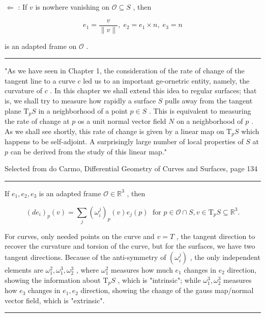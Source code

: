 \documentclass[lang=cn,a4paper,11pt,openany,twoside]{elegantbook}
\newcommand{\HRule}{\begin{center}\rule{0.9\linewidth}{0.2mm}\end{center}}
\begin{document}
\(\Leftarrow\) : If \(v\) is nowhere vanishing on \(\mathcal{O} \subseteq  S\) , then

\[
{e}_{1} = \frac{v}{\parallel v\parallel },\;{e}_{2} = {e}_{1} \times  n,\;{e}_{3} = n
\]

is an adapted frame on \(\mathcal{O}\) .

\HRule

"As we have seen in Chapter 1, the consideration of the rate of change of the tangent line to a curve \(c\) led us to an important ge-ornetric entity, namely, the curvature of \(c\) . In this chapter we shall extend this idea to regular surfaces; that is, we shall try to measure how rapidly a surface \(S\) pulls away from the tangent plane \({\mathrm{T}}_{p}S\) in a neighborhood of a point \(p \in  S\) . This is equivalent to measuring the rate of change at \(p\) os a unit normal vector field \(N\) on a neighborhood of \(p\) . As we shall see shortly, this rate of change is given by a linear map on \({\mathrm{T}}_{p}S\) which happens to be self-adjoint. A surprisingly large number of local properties of \(S\) at \(p\) can be derived from the study of this linear map."

Selected from do Carmo, Differential Geometry of Curves and Surfaces, page 134

\HRule

If \({e}_{1},{e}_{2},{e}_{3}\) is an adapted frame \(\mathcal{O} \in  {\mathbb{R}}^{3}\) , then

\[
{\left( d{e}_{i}\right) }_{p}\left( v\right)  = \mathop{\sum }\limits_{j}{\left( {\omega }_{i}^{j}\right) }_{p}\left( v\right) {e}_{j}\left( p\right) \;\text{ for }p \in  \mathcal{O} \cap  S,v \in  {\mathrm{T}}_{p}S \subseteq  {\mathbb{R}}^{3}.
\]

For curves, only needed points on the curve and \(v = T\) , the tangent direction to recover the curvature and torsion of the curve, but for the surfaces, we have two tangent directions. Because of the anti-symmetry of \(\left( {\omega }_{i}^{j}\right)\) , the only independent elements are \({\omega }_{1}^{2},{\omega }_{1}^{3},{\omega }_{2}^{3}\) , where \({\omega }_{1}^{2}\) measures how much \({e}_{1}\) changes in \({e}_{2}\) direction, showing the information about \({\mathrm{T}}_{p}S\) , which is "intrinsic"; while \({\omega }_{1}^{3},{\omega }_{2}^{3}\) measures how \({e}_{3}\) changes in \({e}_{1},{e}_{2}\) direction, showing the change of the gauss map/normal vector field, which is "extrinsic".

\HRule
\end{document}
